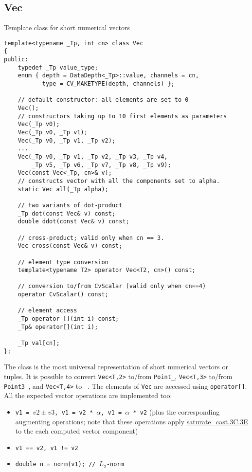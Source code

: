 \subsection{Vec}\label{Vec}
Template class for short numerical vectors

\begin{lstlisting}
template<typename _Tp, int cn> class Vec
{
public:
    typedef _Tp value_type;
    enum { depth = DataDepth<_Tp>::value, channels = cn,
           type = CV_MAKETYPE(depth, channels) };
    
    // default constructor: all elements are set to 0
    Vec();
    // constructors taking up to 10 first elements as parameters
    Vec(_Tp v0);
    Vec(_Tp v0, _Tp v1);
    Vec(_Tp v0, _Tp v1, _Tp v2);
    ...
    Vec(_Tp v0, _Tp v1, _Tp v2, _Tp v3, _Tp v4,
        _Tp v5, _Tp v6, _Tp v7, _Tp v8, _Tp v9);
    Vec(const Vec<_Tp, cn>& v);
    // constructs vector with all the components set to alpha.
    static Vec all(_Tp alpha);
    
    // two variants of dot-product
    _Tp dot(const Vec& v) const;
    double ddot(const Vec& v) const;
    
    // cross-product; valid only when cn == 3.
    Vec cross(const Vec& v) const;
    
    // element type conversion
    template<typename T2> operator Vec<T2, cn>() const;
    
    // conversion to/from CvScalar (valid only when cn==4)
    operator CvScalar() const;
    
    // element access
    _Tp operator [](int i) const;
    _Tp& operator[](int i);

    _Tp val[cn];
};
\end{lstlisting}

The class is the most universal representation of short numerical vectors or tuples. It is possible to convert \texttt{Vec<T,2>} to/from \texttt{Point\_}, \texttt{Vec<T,3>} to/from \texttt{Point3\_}, and \texttt{Vec<T,4>} to ~. The elements of \texttt{Vec} are accessed using \texttt{operator[]}. All the expected vector operations are implemented too:

\begin{itemize}
    \item \texttt{v1 = $v2 \pm v3$, v1 = v2 * $\alpha$, v1 = $\alpha$ * v2} (plus the corresponding augmenting operations; note that these operations apply \hyperref[saturatecast]{saturate\_cast.3C.3E} to the each computed vector component)
    \item \texttt{v1 == v2, v1 != v2}
    \item \texttt{double n = norm(v1); // $L_2$-norm}
\end{itemize}

